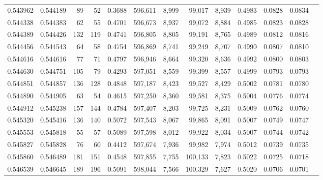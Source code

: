\begin{tabular}{rrrrrrrrrrrrr}
0.543962 & 0.544189 &    89 &    52 &                                     0.3688 & 596,611 &   8,999 &  99,017 &   8,939 & 0.4983 & 0.0828 & 0.0834 \\
0.544338 & 0.544383 &    62 &    55 &                                     0.4701 & 596,673 &   8,937 &  99,072 &   8,884 & 0.4985 & 0.0823 & 0.0828 \\
0.544389 & 0.544426 &   132 &   119 &                                     0.4741 & 596,805 &   8,805 &  99,191 &   8,765 & 0.4989 & 0.0812 & 0.0816 \\
0.544456 & 0.544543 &    64 &    58 &                                     0.4754 & 596,869 &   8,741 &  99,249 &   8,707 & 0.4990 & 0.0807 & 0.0810 \\
0.544616 & 0.544616 &    77 &    71 &                                     0.4797 & 596,946 &   8,664 &  99,320 &   8,636 & 0.4992 & 0.0800 & 0.0803 \\
0.544630 & 0.544751 &   105 &    79 &                                     0.4293 & 597,051 &   8,559 &  99,399 &   8,557 & 0.4999 & 0.0793 & 0.0793 \\
0.544851 & 0.544857 &   136 &   128 &                                     0.4848 & 597,187 &   8,423 &  99,527 &   8,429 & 0.5002 & 0.0781 & 0.0780 \\
0.544890 & 0.544905 &    63 &    54 &                                     0.4615 & 597,250 &   8,360 &  99,581 &   8,375 & 0.5004 & 0.0776 & 0.0774 \\
0.544912 & 0.545238 &   157 &   144 &                                     0.4784 & 597,407 &   8,203 &  99,725 &   8,231 & 0.5009 & 0.0762 & 0.0760 \\
0.545320 & 0.545416 &   136 &   140 &                                     0.5072 & 597,543 &   8,067 &  99,865 &   8,091 & 0.5007 & 0.0749 & 0.0747 \\
0.545553 & 0.545818 &    55 &    57 &                                     0.5089 & 597,598 &   8,012 &  99,922 &   8,034 & 0.5007 & 0.0744 & 0.0742 \\
0.545827 & 0.545828 &    76 &    60 &                                     0.4412 & 597,674 &   7,936 &  99,982 &   7,974 & 0.5012 & 0.0739 & 0.0735 \\
0.545860 & 0.546489 &   181 &   151 &                                     0.4548 & 597,855 &   7,755 & 100,133 &   7,823 & 0.5022 & 0.0725 & 0.0718 \\
0.546539 & 0.546645 &   189 &   196 &                                     0.5091 & 598,044 &   7,566 & 100,329 &   7,627 & 0.5020 & 0.0706 & 0.0701 \\

\end{tabular}
